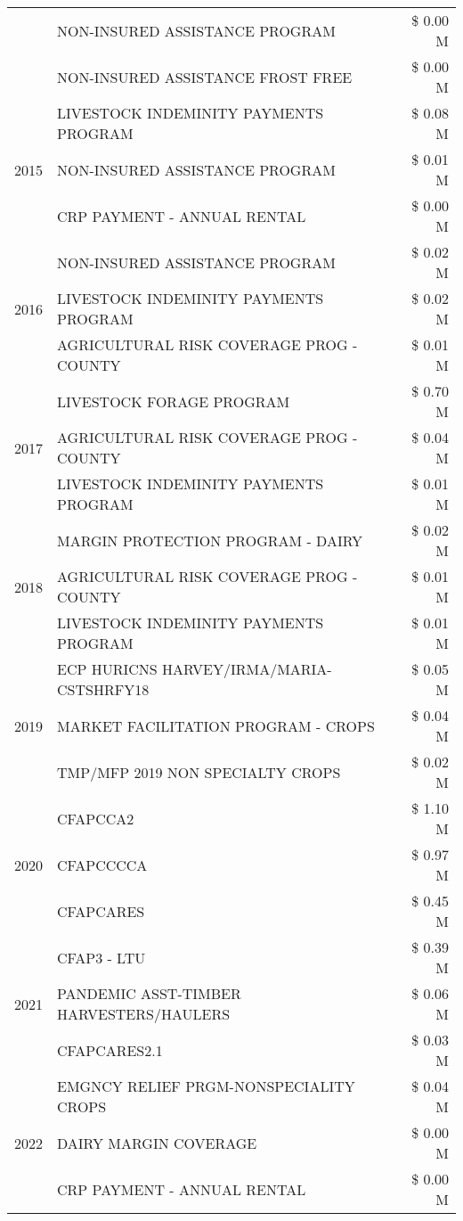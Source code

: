 \begin{tabular}{llr}
 & NON-INSURED ASSISTANCE PROGRAM & \$ 0.00 M \\
 & NON-INSURED ASSISTANCE FROST FREE & \$ 0.00 M \\
\cline{1-3}
\multirow[t]{3}{*}{2015} & LIVESTOCK INDEMINITY PAYMENTS PROGRAM & \$ 0.08 M \\
 & NON-INSURED ASSISTANCE PROGRAM & \$ 0.01 M \\
 & CRP PAYMENT - ANNUAL RENTAL & \$ 0.00 M \\
\cline{1-3}
\multirow[t]{3}{*}{2016} & NON-INSURED ASSISTANCE PROGRAM & \$ 0.02 M \\
 & LIVESTOCK INDEMINITY PAYMENTS PROGRAM & \$ 0.02 M \\
 & AGRICULTURAL RISK COVERAGE PROG - COUNTY & \$ 0.01 M \\
\cline{1-3}
\multirow[t]{3}{*}{2017} & LIVESTOCK FORAGE PROGRAM & \$ 0.70 M \\
 & AGRICULTURAL RISK COVERAGE PROG - COUNTY & \$ 0.04 M \\
 & LIVESTOCK INDEMINITY PAYMENTS PROGRAM & \$ 0.01 M \\
\cline{1-3}
\multirow[t]{3}{*}{2018} & MARGIN PROTECTION PROGRAM - DAIRY & \$ 0.02 M \\
 & AGRICULTURAL RISK COVERAGE PROG - COUNTY & \$ 0.01 M \\
 & LIVESTOCK INDEMINITY PAYMENTS PROGRAM & \$ 0.01 M \\
\cline{1-3}
\multirow[t]{3}{*}{2019} & ECP HURICNS HARVEY/IRMA/MARIA-CSTSHRFY18 & \$ 0.05 M \\
 & MARKET FACILITATION PROGRAM - CROPS & \$ 0.04 M \\
 & TMP/MFP 2019 NON SPECIALTY CROPS & \$ 0.02 M \\
\cline{1-3}
\multirow[t]{3}{*}{2020} & CFAPCCA2 & \$ 1.10 M \\
 & CFAPCCCCA & \$ 0.97 M \\
 & CFAPCARES & \$ 0.45 M \\
\cline{1-3}
\multirow[t]{3}{*}{2021} & CFAP3 - LTU & \$ 0.39 M \\
 & PANDEMIC ASST-TIMBER HARVESTERS/HAULERS & \$ 0.06 M \\
 & CFAPCARES2.1 & \$ 0.03 M \\
\cline{1-3}
\multirow[t]{3}{*}{2022} & EMGNCY RELIEF PRGM-NONSPECIALITY CROPS & \$ 0.04 M \\
 & DAIRY MARGIN COVERAGE & \$ 0.00 M \\
 & CRP PAYMENT - ANNUAL RENTAL & \$ 0.00 M \\
\cline{1-3}
\bottomrule
\end{tabular}
